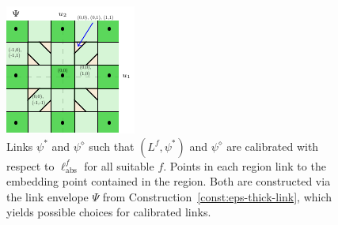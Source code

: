 \documentclass[twoside,11pt]{article}
\newcommand{\Comments}{1}
\newcommand{\mynote}[2]{\ifnum\Comments=1\textcolor{#1}{#2}\fi}
\newcommand{\raf}[1]{\mynote{darkgreen}{[RF: #1]}}
\newcommand{\jessie}[1]{\mynote{teal}{[JF: #1]}}
\newcommand{\ellabs}{\ell_{\text{abs}}^f}
\begin{document}
\begin{figure}
\begin{center}
\begin{minipage}{0.32\linewidth}
		\end{minipage}\hfill
		\begin{minipage}{0.32\linewidth}
		\includegraphics[width=\linewidth]{tikz/lovasz-link-envelope.pdf}
		\end{minipage}\hfill
		\caption{Links $\psi^*$ and $\psi^\diamond$ such that $(L^f, \psi^*)$ and $\psi^\diamond$ are calibrated with respect to $\ellabs$ for all suitable $f$. Points in each region link to the embedding point contained in the region. Both are constructed via the link envelope $\Psi$ from Construction~\ref{const:eps-thick-link}, which yields possible choices for calibrated links.
			}
		\label{fig:lovasz-links}
	\end{center}
\end{figure}
\end{document}
